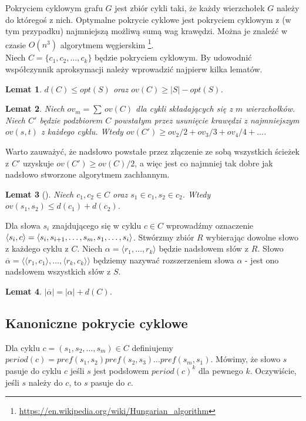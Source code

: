 \documentclass[12pt]{article}
\newtheorem{lemma}{Lemat}[section]
\begin{document}
Pokryciem cyklowym grafu $G$ jest zbiór cykli taki, że każdy wierzchołek $G$ należy do któregoś z nich.
Optymalne pokrycie cyklowe jest pokryciem cyklowym z (w tym przypadku) najmniejszą możliwą sumą wag krawędzi.
Można je znaleźć w czasie $O(n^3)$ algorytmem węgierskim \footnote{\url{https://en.wikipedia.org/wiki/Hungarian_algorithm}}. \\

Niech $C=\{c_1,c_2,\dots,c_k\}$ będzie pokryciem cyklowym.
By udowodnić współczynnik aproksymacji należy wprowadzić najpierw kilka lematów.

\begin{lemma}
$d(C) \leq opt(S)$ oraz $ov(C) \geq |S|-opt(S)$.
\end{lemma}
\begin{lemma}
Niech $ov_m=\sum\,ov(C)$ dla cykli składających się z $m$ wierzchołków.
Niech $C'$ będzie podzbiorem $C$ powstałym przez usunięcie krawędzi z najmniejszym $ov(s,t)$ z każdego cyklu.
Wtedy $ov(C') \geq ov_2/2+ov_3/3+ov_4/4+\dots$.
\end{lemma}
Warto zauważyć, że nadsłowo powstałe przez złączenie ze sobą wszystkich ścieżek z $C'$ uzyskuje $ov(C') \geq ov(C)/2$, a więc jest co najmniej tak dobre jak nadsłowo stworzone algorytmem zachłannym.
\begin{lemma}[\cite{Blum-Jiang}]
Niech $c_1,c_2 \in C$ oraz $s_1 \in c_1, s_2 \in c_2$.
Wtedy $ov(s_1,s_2) \leq d(c_1)+d(c_2)$.
\end{lemma}
Dla słowa $s_i$ znajdującego się w cyklu $c \in C$ wprowadźmy oznaczenie $\langle s_i,c \rangle = \\ \langle s_i,s_{i+1},\dots,s_m,s_1,\dots,s_i \rangle$.
Stwórzmy zbiór $R$ wybierając dowolne słowo z każdego cyklu z $C$.
Niech $\alpha=\langle r_1,\dots,r_k \rangle$ będzie nadsłowem słów z $R$.
Słowo $\overline{\alpha}=\langle \langle r_1,c_1 \rangle,\dots,\langle r_k,c_k \rangle \rangle$ będziemy nazywać rozszerzeniem słowa $\alpha$ - jest ono nadsłowem wszystkich słów z $S$.
\begin{lemma}
$|\overline{\alpha}|=|\alpha|+d(C)$.
\end{lemma}

\subsection{Kanoniczne pokrycie cyklowe}

Dla cyklu $c = (s_1,s_2,\dots,s_m) \in C$ definiujemy $period(c)=pref(s_1,s_2)pref(s_2,s_3) \dots pref(s_m,s_1)$.
Mówimy, że słowo $s$ pasuje do cyklu $c$ jeśli $s$ jest podsłowem $period(c)^k$ dla pewnego $k$.
Oczywiście, jeśli $s$ należy do $c$, to $s$ pasuje do $c$. \\
\end{document}
